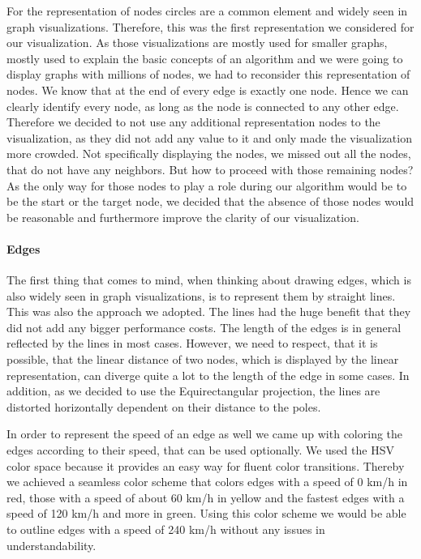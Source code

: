 \documentclass
[
    paper = a4,
    pagesize,
    12 pt,
    oneside,                       %
    open = right,
    DIV = calc,
    BCOR = 0 mm,                   %
    bibtotoc
]
{scrbook}
\begin{document}
\par For the representation of nodes circles are a common element and widely seen in graph visualizations.
Therefore, this was the first representation we considered for our visualization.
As those visualizations are mostly used for smaller graphs, mostly used to explain the basic concepts of an algorithm and we were going to display graphs with millions of nodes, we had to reconsider this representation of nodes.
We know that at the end of every edge is exactly one node.
Hence we can clearly identify every node, as long as the node is connected to any other edge.
Therefore we decided to not use any additional representation nodes to the visualization, as they did not add any value to it and only made the visualization more crowded.
Not specifically displaying the nodes, we missed out all the nodes, that do not have any neighbors.
But how to proceed with those remaining nodes?
As the only way for those nodes to play a role during our algorithm would be to be the start or the target node, we decided that the absence of those nodes would be reasonable and furthermore improve the clarity of our visualization.


\paragraph{Edges}

The first thing that comes to mind, when thinking about drawing edges, which is also widely seen in graph visualizations, is to represent them by straight lines.
This was also the approach we adopted.
The lines had the huge benefit that they did not add any bigger performance costs.
The length of the edges is in general reflected by the lines in most cases.
However, we need to respect, that it is possible, that the linear distance of two nodes, which is displayed by the linear representation, can diverge quite a lot to the length of the edge in some cases.
In addition, as we decided to use the Equirectangular projection, the lines are distorted horizontally dependent on their distance to the poles.

In order to represent the speed of an edge as well we came up with coloring the edges according to their speed, that can be used optionally.
We used the HSV color space because it provides an easy way for fluent color transitions.
Thereby we achieved a seamless color scheme that colors edges with a speed of 0 km/h in red, those with a speed of about 60 km/h in yellow and the fastest edges with a speed of 120 km/h and more in green.
Using this color scheme we would be able to outline edges with a speed of 240 km/h without any issues in understandability.
\end{document}
